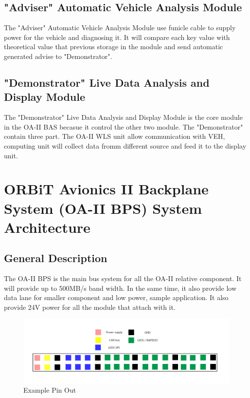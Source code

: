 \documentclass[12pt,article]{memoir}
\begin{document}
\section{"Adviser" Automatic Vehicle Analysis Module}
The "Adviser" Automatic Vehicle Analysis Module use funicle cable to supply power for the vehicle and diagnosing it. It will compare each key value with theoretical value that previous storage in the module and send automatic generated advise to "Demonstrator".
\section{"Demonstrator" Live Data Analysis and Display Module}
The "Demonstrator" Live Data Analysis and Display Module is the core module in the OA-II BAS becasue it control the other two module. The "Demonstrator" contain three part. The OA-II WLS unit allow communication with VEH, computing unit will collect data fromm different source and feed it to the display unit.
\chapter{ORBiT Avionics II Backplane System (OA-II BPS) System Architecture}
\section{General Description}
The OA-II BPS is the main bus system for all the OA-II relative component. It will provide up to 500MB/s band width. In the same time, it also provide low data lane for smaller component and low power, sample application. It also provide 24V power for all the module that attach with it.
\begin{figure}[h]
\includegraphics[width=\textwidth]{BPS_Pin.png}
 \caption{Example Pin Out}	
\end{figure}

\end{document}
